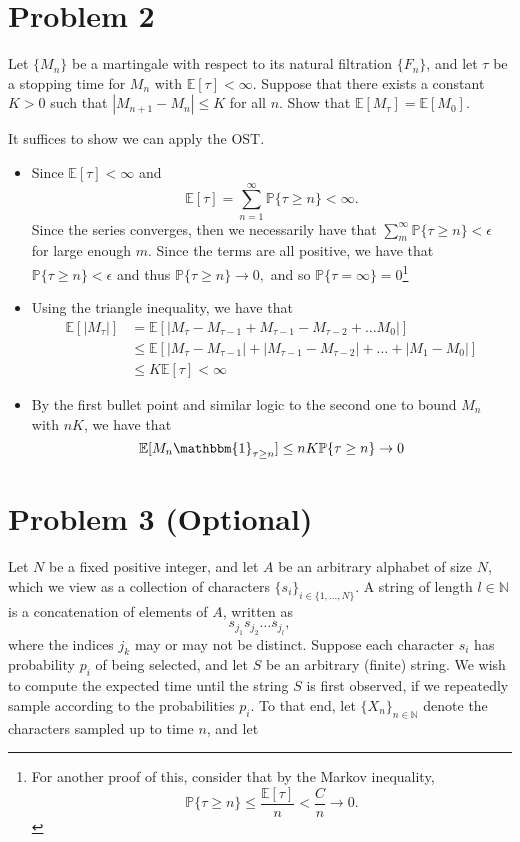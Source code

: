 \documentclass[11pt]{article}
\newcommand{\bbE}{\mathbb{E}}
\newcommand{\bbP}{\mathbb{P}}
\begin{document}
\section*{Problem 2}
Let \(\{M_n\}\) be a martingale with respect to its natural filtration \(\{F_n\}\), and let \(\tau\) be a stopping time for \(M_n\) with \(\mathbb{E}[\tau] < \infty\). Suppose that there exists a constant \(K > 0\) such that \(|M_{n+1} - M_n| \leq K\) for all \(n\). Show that \(\mathbb{E}[M_\tau] = \mathbb{E}[M_0]\).
\begin{solution}
    It suffices to show we can apply the OST.
    \begin{itemize}
    \item Since $\bbE[\tau] < \infty$ and 
    \[\bbE[\tau] = \sum_{n=1}^\infty \bbP\{\tau \geq n\} < \infty.\] Since the series converges, then we necessarily have that $\sum_m^\infty \bbP\{\tau \geq n\} < \epsilon$ for large enough $m.$ Since the terms are all positive, we have that $\bbP\{\tau \geq n\} < \epsilon$ and thus $\bbP\{\tau \geq n\} \to 0,$ and so $\bbP\{\tau = \infty\} = 0$\footnote{For another proof of this, consider that by the Markov inequality, 
    \[\bbP\{\tau \geq n\} \leq \frac{\bbE[\tau]}{n} < \frac{C}{n} \to 0.\]
    }
    \item Using the triangle inequality, we have that 
    \begin{align*}
        \bbE[|M_\tau|] &= \bbE[|M_\tau - M_{\tau -1} + M_{\tau - 1} - M_{\tau - 2} + \dots M_0|]\\
        &\leq \bbE[|M_\tau -M_{\tau -1}| + |M_{\tau - 1} - M_{\tau - 2}| + \dots + |M_1 - M_0|]\\
        &\leq K\bbE[\tau] < \infty
    \end{align*} 
    \item By the first bullet point and similar logic to the second one to bound $M_n$ with $nK$, we have that 
    \[\bbE[M_n \mathbbm{1}_{\tau \geq n}] \leq nK\bbP\{\tau \geq n\}\to 0\]
    \end{itemize}
\end{solution}

\newpage

\section*{Problem 3 (Optional)}
Let \(N\) be a fixed positive integer, and let \(A\) be an arbitrary alphabet of size \(N\), which we view as a collection of characters \(\{s_i\}_{i \in \{1, \ldots, N\}}\). A string of length \(l \in \mathbb{N}\) is a concatenation of elements of \(A\), written as
\[
s_{j_1} s_{j_2} \ldots s_{j_l},
\]
where the indices \(j_k\) may or may not be distinct. Suppose each character \(s_i\) has probability \(p_i\) of being selected, and let \(S\) be an arbitrary (finite) string. We wish to compute the expected time until the string \(S\) is first observed, if we repeatedly sample according to the probabilities \(p_i\). To that end, let \(\{X_n\}_{n \in \mathbb{N}}\) denote the characters sampled up to time \(n\), and let
\end{document}
